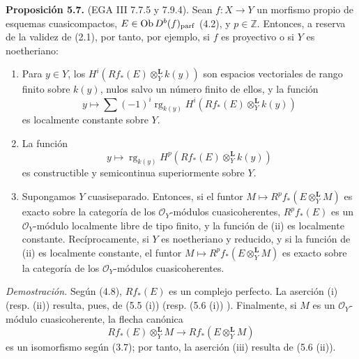 \textbf{Proposición 5.7.} (EGA III 7.7.5 y 7.9.4). Sean \(f:X\to Y\) un morfismo propio de esquemas cuasicompactos, \(E\in\operatorname{Ob} D^b(f)_{\mathrm{parf}}\) (4.2), y \(p\in\mathbb Z\). Entonces, a reserva de la validez de (2.1), por tanto, por ejemplo, si \(f\) es proyectivo o si \(Y\) es noetheriano:
\begin{enumerate}[label=(\roman*)]
\item Para \(y\in Y\), los \(H^i(Rf_*(E)\otimes_Y^{\mathbf L}k(y))\) son espacios vectoriales de rango finito sobre \(k(y)\), nulos salvo un número finito de ellos, y la función
\[
 y\longmapsto\sum(-1)^i\operatorname{rg}_{k(y)}H^i(Rf_*(E)\otimes_Y^{\mathbf L}k(y))
\]
es localmente constante sobre \(Y\).
\item La función
\[
 y\longmapsto\operatorname{rg}_{k(y)}H^p(Rf_*(E)\otimes_Y^{\mathbf L}k(y))
\]
es constructible y semicontinua superiormente sobre \(Y\).
\item Supongamos \(Y\) cuasiseparado. Entonces, si el funtor \(M\mapsto R^pf_*(E\otimes_Y^{\mathbf L}M)\) es exacto sobre la categoría de los \(\mathcal O_Y\)-módulos cuasicoherentes, \(R^pf_*(E)\) es un \(\mathcal O_Y\)-módulo localmente libre de tipo finito, y la función de (ii) es localmente constante. Recíprocamente, si \(Y\) es noetheriano y reducido, y si la función de (ii) es localmente constante, el funtor \(M\mapsto R^pf_*(E\otimes_Y^{\mathbf L}M)\) es exacto sobre la categoría de los \(\mathcal O_Y\)-módulos cuasicoherentes.
\end{enumerate}

\emph{Demostración.} Según (4.8), \(Rf_*(E)\) es un complejo perfecto. La aserción (i) (resp. (ii)) resulta, pues, de (5.5 (i)) (resp. (5.6 (i)) ). Finalmente, si \(M\) es un \(\mathcal O_Y\)-módulo cuasicoherente, la flecha canónica
\[
 Rf_*(E)\otimes_Y^{\mathbf L}M\longrightarrow Rf_*(E\otimes_Y^{\mathbf L}M)
\]
es un isomorfismo según (3.7); por tanto, la aserción (iii) resulta de (5.6 (ii)).
